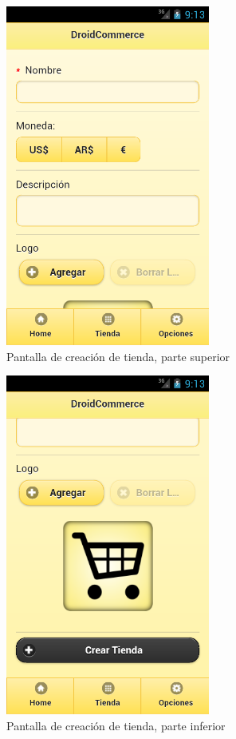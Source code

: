 \begin{figure}
  \centering
    \includegraphics[width=0.6\textwidth]{imagenes/capturas/crear-tienda1.png}
        \caption{Pantalla de creación de tienda, parte superior}
    \label{fig:crear-tienda-1}
\end{figure}

\begin{figure}
  \centering
    \includegraphics[width=0.6\textwidth]{imagenes/capturas/crear-tienda2.png}
        \caption{Pantalla de creación de tienda, parte inferior}
    \label{fig:crear-tienda-2}
\end{figure}


